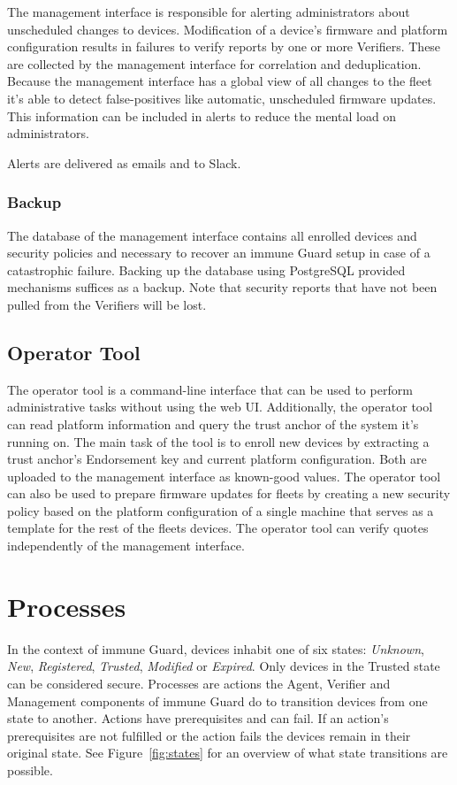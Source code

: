 \documentclass[a4paper,oneside,10pt,extrafontsizes]{memoir}
\newcommand\todo[1]{\textcolor{red}{TODO: #1\newline}}
\begin{document}
The management interface is responsible for alerting administrators about
unscheduled changes to devices. Modification of a device's firmware and
platform configuration results in failures to verify reports by one or more
Verifiers. These are collected by the management interface for correlation and
deduplication. Because the management interface has a global view of all changes
to the fleet it's able to detect false-positives like automatic, unscheduled
firmware updates. This information can be included in alerts to reduce the
mental load on administrators.

Alerts are delivered as emails and to Slack.

\subsection*{Backup}
The database of the management interface contains all enrolled devices and
security policies and  necessary to recover an immune Guard setup in case of a
catastrophic failure. Backing up the database using PostgreSQL provided
mechanisms suffices as a backup. Note that security reports that have not been
pulled from the Verifiers will be lost.


\section{Operator Tool}

The operator tool is a command-line interface that can be used to perform
administrative tasks without using the web UI.  Additionally, the operator tool
can read platform information and query the trust anchor of the system it's
running on. The main task of the tool is to enroll new devices by extracting a
trust anchor's Endorsement key and current platform configuration. Both are
uploaded to the management interface as known-good values. The operator tool
can also be used to prepare firmware updates for fleets by creating a new
security policy based on the platform configuration of a single machine that
serves as a template for the rest of the fleets devices. The operator tool
can verify quotes independently of the management interface.

\chapter{Processes}

In the context of immune Guard, devices inhabit one of six states:
\emph{Unknown}, \emph{New}, \emph{Registered}, \emph{Trusted}, \emph{Modified}
or \emph{Expired}. Only devices in the Trusted state can be considered secure.
Processes are actions the Agent, Verifier and Management components of immune
Guard do to transition devices from one state to another. Actions have
prerequisites and can fail. If an action's prerequisites are not fulfilled or
the action fails the devices remain in their original state. See
Figure~\ref{fig:states} for an overview of what state transitions are possible.
\end{document}
